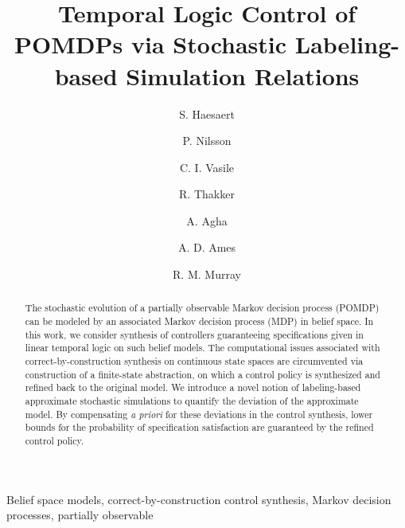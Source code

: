 \documentclass{ifacconf}
\begin{document}
\begin{frontmatter}

\title{Temporal Logic Control of POMDPs via Stochastic Labeling-based Simulation Relations}

\author[cal]{S. Haesaert}
\author[cal]{P. Nilsson}
\author[mit]{C. I. Vasile}
\author[jpl]{R. Thakker}
\author[jpl]{A. Agha}
\author[cal]{A. D.  Ames}
\author[cal]{R. M. Murray}



\address[cal]{California Institute of Technology,
   Pasadena, CA 91125 USA} %
\address[mit]{Massachusetts Institute of Technology,
   Cambridge, MA 02139 USA}%
\address[jpl]{Jet Propulsion Laboratory,
   Pasadena, CA 91109 USA}%
\maketitle
\begin{abstract}
The stochastic evolution of a partially observable Markov decision process (POMDP) can be modeled by an associated Markov decision process (MDP) in belief space.
In this work, we consider synthesis of controllers guaranteeing  specifications given in linear temporal logic on such belief models. The computational issues associated with correct-by-construction synthesis on continuous state spaces are circumvented via construction of a finite-state abstraction, on which a control policy is synthesized and refined back to the original model. We introduce a novel notion of labeling-based approximate stochastic simulations to quantify the deviation of the approximate model. By compensating {\it a priori} for these deviations in the control synthesis, lower bounds for the probability of specification satisfaction are guaranteed by the refined control policy.
\end{abstract}
\begin{keyword} Belief space models,
correct-by-construction control synthesis, Markov decision processes, partially observable
\end{keyword}

\end{frontmatter}
\end{document}
